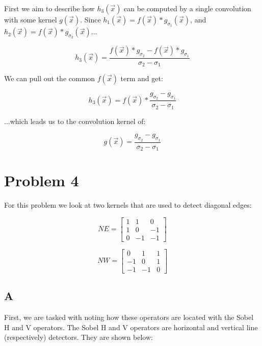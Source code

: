 \documentclass{article}
\begin{document}
First we aim to describe how $h_3(\vec{x})$ can be computed by a single convolution with some kernel $g(\vec{x})$. Since $h_1(\vec{x}) = f(\vec{x}) * g_{\sigma_1}(\vec{x})$, and $h_2(\vec{x}) = f(\vec{x}) * g_{\sigma_2}(\vec{x})$...  

\begin{equation}
  h_3(\vec{x}) = \frac{f(\vec{x})*g_{\sigma_2}-f(\vec{x})*g_{\sigma_1}}{\sigma_2 - \sigma_1}
\end{equation}

\noindent We can pull out the common $f(\vec{x})$ term and get:

\begin{equation}
    h_3(\vec{x}) = f(\vec{x})*\frac{g_{\sigma_2} - g_{\sigma_1}}{\sigma_2 - \sigma_1}
\end{equation}

\noindent ...which leads us to the convolution kernel of:

\begin{equation}
    g(\vec{x}) = \frac{g_{\sigma_2} - g_{\sigma_1}}{\sigma_2 - \sigma_1}
\end{equation}


\section*{Problem 4}
For this problem we look at two kernels that are used to detect diagonal edges:

\begin{equation}
    NE = \begin{bmatrix}
        1 & 1 & 0 \\
        1 & 0 & -1 \\
        0 & -1 & -1
    \end{bmatrix}
\end{equation}

\begin{equation}
    NW = \begin{bmatrix}
        0 & 1 & 1 \\
        -1 & 0 & 1 \\
        -1 & -1 & 0
    \end{bmatrix}
\end{equation}

\subsection*{A}

First, we are tasked with noting how these operators are located with the Sobel H and V operators. The Sobel H and V operators are horizontal and vertical line (respectively) detectors. They are shown below:
\end{document}
